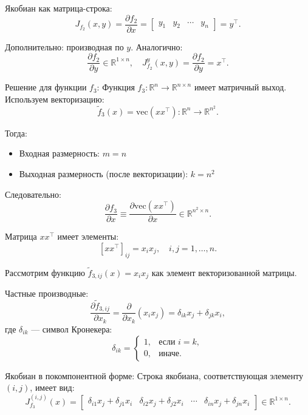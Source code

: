 \documentclass[pract]{SCWorks}
\begin{document}
    Якобиан как матрица-строка:
    \[
    \boxed{J_{f_2}(x, y) = \frac{\partial f_2}{\partial x} =
    \begin{bmatrix}
    y_1 & y_2 & \cdots & y_n
    \end{bmatrix} = y^\top}.
    \]

    Дополнительно: производная по $y$.
    Аналогично:
    \[
    \boxed{\frac{\partial f_2}{\partial y} \in \mathbb{R}^{1 \times n}, \quad J_{f_2}^y(x, y) = \frac{\partial f_2}{\partial y} = x^\top}.
    \]

    Решение для функции $f_3$:
    Функция $f_3: \mathbb{R}^n \to \mathbb{R}^{n \times n}$ имеет матричный выход. Используем векторизацию:
    \[
    \tilde{f}_3(x) = \mathrm{vec}(xx^\top): \mathbb{R}^n \to \mathbb{R}^{n^2}.
    \]

    Тогда:
    \begin{itemize}
        \item[$\bullet$] Входная размерность: $m = n$
        \item[$\bullet$] Выходная размерность (после векторизации): $k = n^2$
    \end{itemize}

    Следовательно:
    \[
    \boxed{\frac{\partial f_3}{\partial x} \equiv \frac{\partial \mathrm{vec}(xx^\top)}{\partial x} \in \mathbb{R}^{n^2 \times n}}.
    \]

    Матрица $xx^\top$ имеет элементы:
    \[
    [xx^\top]_{ij} = x_i x_j, \quad i, j = 1, \dots, n.
    \]

    Рассмотрим функцию $\tilde{f}_{3,ij}(x) = x_i x_j$ как элемент векторизованной матрицы.

    Частные производные:
    \[
    \frac{\partial \tilde{f}_{3,ij}}{\partial x_k} = \frac{\partial}{\partial x_k} (x_i x_j) = \delta_{ik} x_j + \delta_{jk} x_i,
    \]
    где $\delta_{ik}$ — символ Кронекера:
    \[
    \delta_{ik} =
    \begin{cases}
    1, & \text{если } i = k, \\
    0, & \text{иначе}.
    \end{cases}
    \]

    Якобиан в покомпонентной форме:
    Строка якобиана, соответствующая элементу $(i, j)$, имеет вид:
    \[
    J_{f_3}^{(i,j)}(x) =
    \begin{bmatrix}
    \delta_{i1} x_j + \delta_{j1} x_i &
    \delta_{i2} x_j + \delta_{j2} x_i &
    \cdots &
    \delta_{in} x_j + \delta_{jn} x_i
    \end{bmatrix} \in \mathbb{R}^{1 \times n}.
    \]
\end{document}

